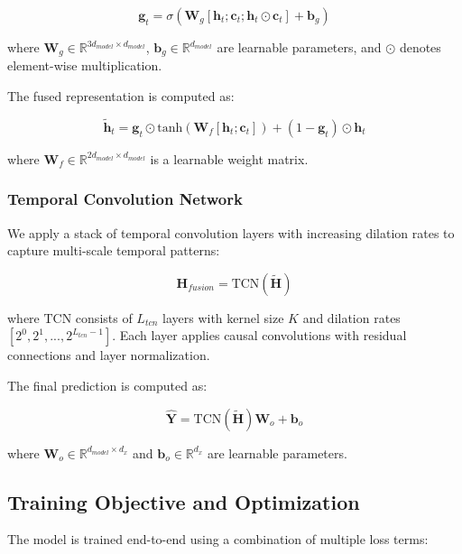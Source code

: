 \begin{equation}
    \mathbf{g}_t = \sigma(\mathbf{W}_g[\mathbf{h}_t; \mathbf{c}_t; \mathbf{h}_t \odot \mathbf{c}_t] + \mathbf{b}_g)
\end{equation}

where $\mathbf{W}_g \in \mathbb{R}^{3d_{model} \times d_{model}}$, $\mathbf{b}_g \in \mathbb{R}^{d_{model}}$ are learnable parameters, and $\odot$ denotes element-wise multiplication.

The fused representation is computed as:

\begin{equation}
    \tilde{\mathbf{h}}_t = \mathbf{g}_t \odot \text{tanh}(\mathbf{W}_f[\mathbf{h}_t; \mathbf{c}_t]) + (1-\mathbf{g}_t) \odot \mathbf{h}_t
\end{equation}

where $\mathbf{W}_f \in \mathbb{R}^{2d_{model} \times d_{model}}$ is a learnable weight matrix.

\subsubsection{Temporal Convolution Network}
We apply a stack of temporal convolution layers with increasing dilation rates to capture multi-scale temporal patterns:

\begin{equation}
    \mathbf{H}_{fusion} = \text{TCN}(\tilde{\mathbf{H}})
\end{equation}

where $\text{TCN}$ consists of $L_{tcn}$ layers with kernel size $K$ and dilation rates $[2^0, 2^1, ..., 2^{L_{tcn}-1}]$. Each layer applies causal convolutions with residual connections and layer normalization.

The final prediction is computed as:

\begin{equation}
    \hat{\mathbf{Y}} = \text{TCN}(\tilde{\mathbf{H}})\mathbf{W}_o + \mathbf{b}_o
\end{equation}

where $\mathbf{W}_o \in \mathbb{R}^{d_{model} \times d_x}$ and $\mathbf{b}_o \in \mathbb{R}^{d_x}$ are learnable parameters.

\subsection{Training Objective and Optimization}
The model is trained end-to-end using a combination of multiple loss terms:

